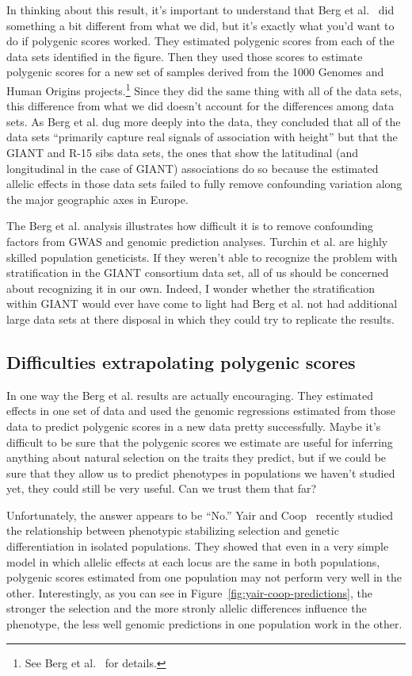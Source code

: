 \documentclass[12pt]{article}
\begin{document}
In thinking about this result, it's important to understand that Berg
et al.~\cite{Berg-etal-2018} did something a bit different from what
we did, but it's exactly what you'd want to do if polygenic scores
worked. They estimated polygenic scores from each of the data sets
identified in the figure. Then they used those scores to estimate
polygenic scores for a new set of samples derived from the 1000
Genomes and Human Origins projects.\footnote{See Berg et
  al.~\cite{Berg-etal-2018} for details.} Since they did the same
thing with all of the data sets, this difference from what we did
doesn't account for the differences among data sets. As Berg et
al. dug more deeply into the data, they concluded that all of the data
sets ``primarily capture real signals of association with height'' but
that the GIANT and R-15 sibs data sets, the ones that show the
latitudinal (and longitudinal in the case of GIANT) associations do so
because the estimated allelic effects in those data sets failed to
fully remove confounding variation along the major geographic axes in
Europe.

The Berg et al. analysis illustrates how difficult it is to remove
confounding factors from GWAS and genomic prediction
analyses. Turchin et al. are highly skilled population geneticists. If
they weren't able to recognize the problem with stratification in the
GIANT consortium data set, all of us should be concerned about
recognizing it in our own. Indeed, I wonder whether the stratification
within GIANT would ever have come to light had Berg et al. not had
additional large data sets at there disposal in which they could try
to replicate the results.

\subsection*{Difficulties extrapolating polygenic scores}

In one way the Berg et al. results are actually encouraging. They
estimated effects in one set of data and used the genomic regressions
estimated from those data to predict polygenic scores in a new data
pretty successfully. Maybe it's difficult to be sure that the
polygenic scores we estimate are useful for inferring anything about
natural selection on the traits they predict, but if we could be sure
that they allow us to predict phenotypes in populations we haven't
studied yet, they could still be very useful. Can we trust them that
far?

Unfortunately, the answer appears to be ``No.'' Yair and
Coop~\cite{Yair-Coop-2021} recently studied the relationship between
phenotypic stabilizing selection and genetic differentiation in
isolated populations. They showed that even in a very simple model in
which allelic effects at each locus are the same in both populations,
polygenic scores estimated from one population may not perform very
well in the other. Interestingly, as you can see in
Figure~\ref{fig:yair-coop-predictions}, the stronger the selection and
the more stronly allelic differences influence the phenotype, the less
well genomic predictions in one population work in the other.
\end{document}
